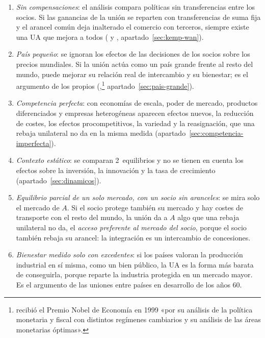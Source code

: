 \documentclass[11pt]{article}
\begin{document}
\begin{enumerate}[label=\alph*)]
\item \emph{Sin compensaciones}: el análisis compara políticas sin transferencias entre los socios. Si las ganancias de la unión se reparten con transferencias de suma fija y el arancel común deja inalterado el comercio con terceros, siempre existe una UA que mejora a todos ( y , apartado~\ref{sec:kemp-wan}).

\item \emph{País pequeño}: se ignoran los efectos de las decisiones de los socios sobre los precios mundiales. Si la unión actúa como un país grande frente al resto del mundo, puede mejorar su relación real de intercambio y su bienestar; es el argumento de los propios  (,\footnote{ recibió el Premio Nobel de Economía en 1999 «por su análisis de la política monetaria y fiscal con distintos regímenes cambiarios y su análisis de las áreas monetarias óptimas»\nocite{Nobel1999Mundell}.} apartado~\ref{sec:pais-grande}).

\item \emph{Competencia perfecta}: con economías de escala, poder de mercado, productos diferenciados y empresas heterogéneas aparecen efectos nuevos, la reducción de costes, los efectos procompetitivos, la variedad y la reasignación, que una rebaja unilateral no da en la misma medida (apartado~\ref{sec:competencia-imperfecta}).

\item \emph{Contexto estático}: se comparan 2~equilibrios y no se tienen en cuenta los efectos sobre la inversión, la innovación y la tasa de crecimiento (apartado~\ref{sec:dinamicos}).

\item \emph{Equilibrio parcial de un solo mercado, con un socio sin aranceles}: se mira solo el mercado de $A$. Si el socio protege también su mercado y hay costes de transporte con el resto del mundo, la unión da a $A$ algo que una rebaja unilateral no da, el \emph{acceso preferente al mercado del socio}, porque el socio también rebaja su arancel: la integración es un intercambio de concesiones\nocite{WonnacottWonnacott1981}.

\item \emph{Bienestar medido solo con excedentes}: si los países valoran la producción industrial en sí misma, como un bien público, la UA es la forma más barata de conseguirla, porque reparte la industria protegida en un mercado mayor\nocite{CooperMassell1965Toward,Johnson1965Economic}. Es el argumento de las uniones entre países en desarrollo de los años 60.
\end{enumerate}
\end{document}
